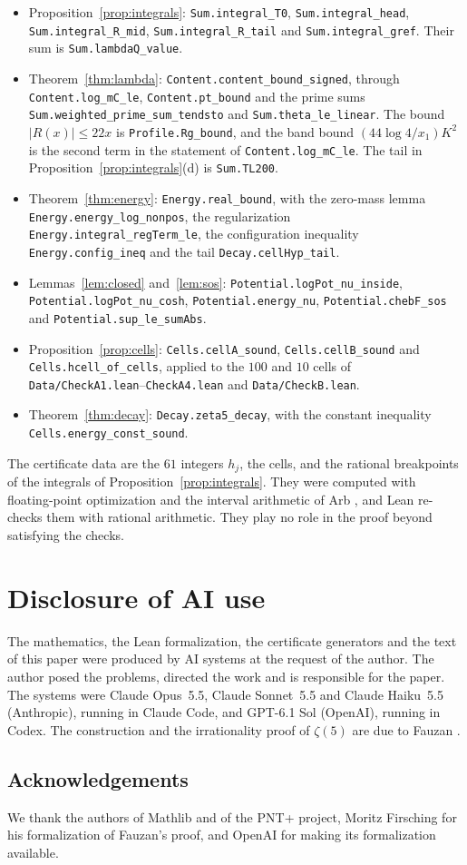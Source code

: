 \documentclass[11pt]{amsart}
\theoremstyle{definition}
\theoremstyle{remark}
\numberwithin{equation}{section}
\newcommand{\lean}[1]{\nolinkurl{#1}}
\begin{document}
\begin{itemize}
\item Proposition~\ref{prop:integrals}: \lean{Sum.integral_T0}, \lean{Sum.integral_head}, \lean{Sum.integral_R_mid}, \lean{Sum.integral_R_tail} and
 \lean{Sum.integral_gref}. Their sum is \lean{Sum.lambdaQ_value}.
\item Theorem~\ref{thm:lambda}: \lean{Content.content_bound_signed}, through \lean{Content.log_mC_le}, \lean{Content.pt_bound}
 and the prime sums \lean{Sum.weighted_prime_sum_tendsto} and \lean{Sum.theta_le_linear}. The bound $|R(x)|\le22x$ is
 \lean{Profile.Rg_bound}, and the band bound $(44\log4/x_1)K^2$ is the second term in the statement of \lean{Content.log_mC_le}. The tail
 in Proposition~\ref{prop:integrals}(d) is \lean{Sum.TL200}.
\item Theorem~\ref{thm:energy}: \lean{Energy.real_bound}, with the zero-mass lemma \lean{Energy.energy_log_nonpos},
 the regularization \lean{Energy.integral_regTerm_le}, the configuration inequality \lean{Energy.config_ineq} and the
 tail \lean{Decay.cellHyp_tail}.
\item Lemmas~\ref{lem:closed} and~\ref{lem:sos}: \lean{Potential.logPot_nu_inside}, \lean{Potential.logPot_nu_cosh},
 \lean{Potential.energy_nu}, \lean{Potential.chebF_sos} and \lean{Potential.sup_le_sumAbs}.
\item Proposition~\ref{prop:cells}: \lean{Cells.cellA_sound}, \lean{Cells.cellB_sound} and \lean{Cells.hcell_of_cells},
 applied to the $100$ and $10$ cells of \lean{Data/CheckA1.lean}--\lean{CheckA4.lean} and \lean{Data/CheckB.lean}.
\item Theorem~\ref{thm:decay}: \lean{Decay.zeta5_decay}, with the constant inequality \lean{Cells.energy_const_sound}.
\end{itemize}
The certificate data are the $61$ integers $h_j$, the cells, and the rational breakpoints of the integrals of
Proposition~\ref{prop:integrals}. They were computed with floating-point optimization and the interval arithmetic of
Arb \cite{Arb}, and Lean re-checks them with rational arithmetic. They play no role in the proof beyond satisfying the
checks.

\section*{Disclosure of AI use}
The mathematics, the Lean formalization, the certificate generators and the text of this paper were produced by AI
systems at the request of the author. The author posed the problems, directed the work and is responsible for the
paper. The systems were Claude Opus~5.5, Claude Sonnet~5.5 and Claude Haiku~5.5 (Anthropic), running in Claude Code,
and GPT-6.1 Sol (OpenAI), running in Codex. The construction and the irrationality proof of $\zeta(5)$ are due to
Fauzan \cite{Fauzan2026}.

\subsection*{Acknowledgements}
We thank the authors of Mathlib and of the PNT+ project, Moritz Firsching for his formalization of Fauzan's proof, and
OpenAI for making its formalization available.



\end{document}
